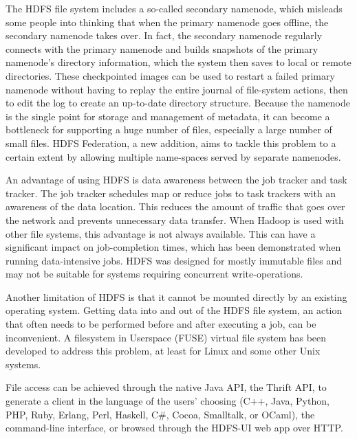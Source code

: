 \documentclass[a4paper,12pt,oneside]{report}
\begin{document}
\begin{enumerate}
                \par The HDFS file system includes a so-called secondary namenode, which misleads some people into thinking that when the primary namenode goes offline, the secondary namenode takes over. In fact, the secondary namenode regularly connects with the primary namenode and builds snapshots of the primary namenode's directory information, which the system then saves to local or remote directories. These checkpointed images can be used to restart a failed primary namenode without having to replay the entire journal of file-system actions, then to edit the log to create an up-to-date directory structure. Because the namenode is the single point for storage and management of metadata, it can become a bottleneck for supporting a huge number of files, especially a large number of small files. HDFS Federation, a new addition, aims to tackle this problem to a certain extent by allowing multiple name-spaces served by separate namenodes.
                \par An advantage of using HDFS is data awareness between the job tracker and task tracker. The job tracker schedules map or reduce jobs to task trackers with an awareness of the data location.
                This reduces the amount of traffic that goes over the network and prevents unnecessary data transfer. When Hadoop is used with other file systems, this advantage is not always available. This can have a significant impact on job-completion times, which has been demonstrated when running data-intensive jobs. HDFS was designed for mostly immutable files and may not be suitable for systems requiring concurrent write-operations.
                \par Another limitation of HDFS is that it cannot be mounted directly by an existing operating system. Getting data into and out of the HDFS file system, an action that often needs to be performed before and after executing a job, can be inconvenient. A filesystem in Userspace (FUSE) virtual file system has been developed to address this problem, at least for Linux and some other Unix systems.
                \par File access can be achieved through the native Java API, the Thrift API, to generate a client in the language of the users' choosing (C++, Java, Python, PHP, Ruby, Erlang, Perl, Haskell, C\#, Cocoa, Smalltalk, or OCaml), the command-line interface, or browsed through the HDFS-UI web app over HTTP.


\end{enumerate}
\end{document}

